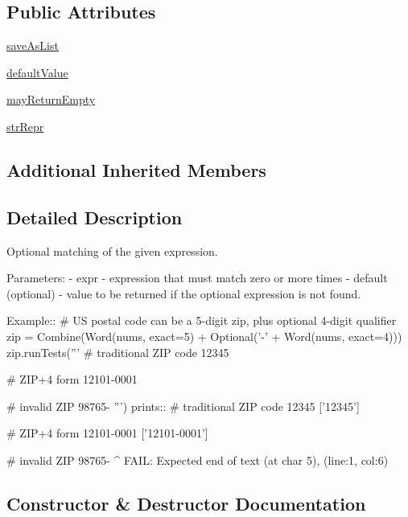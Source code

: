 \subsection*{Public Attributes}
\begin{DoxyCompactItemize}
\item 
\hyperlink{classpkg__resources_1_1__vendor_1_1pyparsing_1_1Optional_a5ad6e109513ef4cb30bc943fefb0aea7}{save\+As\+List}
\item 
\hyperlink{classpkg__resources_1_1__vendor_1_1pyparsing_1_1Optional_a11404c083f62200af585f06f475038e3}{default\+Value}
\item 
\hyperlink{classpkg__resources_1_1__vendor_1_1pyparsing_1_1Optional_a552045a3dc2e454a60c533ad305ad7c5}{may\+Return\+Empty}
\item 
\hyperlink{classpkg__resources_1_1__vendor_1_1pyparsing_1_1Optional_af1f15a2115ea411762e3acc46c32123b}{str\+Repr}
\end{DoxyCompactItemize}
\subsection*{Additional Inherited Members}


\subsection{Detailed Description}
\begin{DoxyVerb}Optional matching of the given expression.

Parameters:
 - expr - expression that must match zero or more times
 - default (optional) - value to be returned if the optional expression is not found.

Example::
    # US postal code can be a 5-digit zip, plus optional 4-digit qualifier
    zip = Combine(Word(nums, exact=5) + Optional('-' + Word(nums, exact=4)))
    zip.runTests('''
        # traditional ZIP code
        12345
        
        # ZIP+4 form
        12101-0001
        
        # invalid ZIP
        98765-
        ''')
prints::
    # traditional ZIP code
    12345
    ['12345']

    # ZIP+4 form
    12101-0001
    ['12101-0001']

    # invalid ZIP
    98765-
         ^
    FAIL: Expected end of text (at char 5), (line:1, col:6)
\end{DoxyVerb}
 

\subsection{Constructor \& Destructor Documentation}
\mbox{\label{classpkg__resources_1_1__vendor_1_1pyparsing_1_1Optional_a961ba4ed7d732d2e1c2c4ff451a59828}} 
